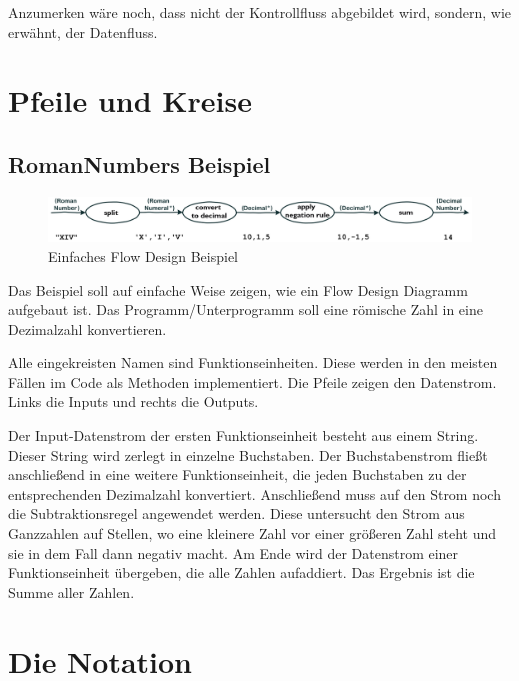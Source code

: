 Anzumerken wäre noch, dass nicht der Kontrollfluss abgebildet wird, sondern, wie erwähnt, der Datenfluss.


\chapter{Pfeile und Kreise}

\section{RomanNumbers Beispiel}

\begin{center}
\begin{figure}[!htbp]
	\includegraphics[width=1.1\linewidth]{./img/FromRomanNumerals.png}
	\caption{Einfaches Flow Design Beispiel}
\end{figure}
\end{center}




Das Beispiel soll auf einfache Weise zeigen, wie ein Flow Design Diagramm aufgebaut ist.
Das Programm/Unterprogramm soll eine römische Zahl in eine Dezimalzahl konvertieren.

Alle eingekreisten Namen sind Funktionseinheiten.
Diese werden in den meisten Fällen im Code als Methoden implementiert.
Die Pfeile zeigen den Datenstrom. Links die Inputs und rechts die Outputs.


Der Input-Datenstrom der ersten Funktionseinheit besteht aus einem String. Dieser String wird zerlegt in einzelne Buchstaben.
Der Buchstabenstrom fließt anschließend in eine weitere Funktionseinheit, die jeden Buchstaben zu der entsprechenden
Dezimalzahl konvertiert. Anschließend muss auf den Strom noch die Subtraktionsregel angewendet werden. Diese untersucht den
Strom aus Ganzzahlen auf Stellen, wo eine kleinere Zahl vor einer größeren Zahl steht und sie in dem Fall dann negativ macht.
Am Ende wird der Datenstrom einer Funktionseinheit übergeben, die alle Zahlen aufaddiert.
Das Ergebnis ist die Summe aller Zahlen.


\newcommand\blfootnote[1]{%
	\begingroup
	\renewcommand\thefootnote{}\footnote{#1}%
	\addtocounter{footnote}{-1}%
	\endgroup
}

\chapter{Die Notation}

